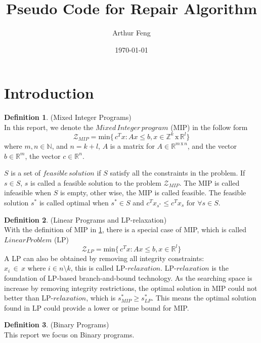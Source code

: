 \documentclass[11pt]{article}
\title{Pseudo Code for Repair Algorithm}
\author{Arthur Feng}
\date{\today}
\theoremstyle{definition}
\newtheorem{definition}{Definition}[section] %
\begin{document}
\maketitle

\section{Introduction}
\begin{definition}
(Mixed Integer Programs)\\
In this report, we denote the $Mixed\,Integer\, program$ (MIP) in the follow form $$\mathcal{Z}_{MIP} = \text{min} \{\, c^Tx : Ax \leq b, x \in \mathbb{Z}^k\,\text{x}\,\mathbb{R}^l \}  $$ 
where $m,n \in \mathbb{N}$, and $n = k + l $,  $A$ is a matrix for $A \in \mathbb{R}^{m \,\text{x}\, n}$, and the vector $b \in \mathbb{R}^m$, the vector $c \in \mathbb{R}^n$. \par
$S$ is a set of $feasible\,solution$ if $S$ satisfy all the constraints in the problem. If $s \in S$, $s$ is called a feasible solution to the problem $\mathcal{Z}_{MIP}$. The MIP is called infeasible when $S$ is empty, other wise, the MIP is called feasible. The feasible solution $s^\ast$ is called optimal when $s^\ast \in S $ and  $ c^Tx_{s^\ast} \leq c^Tx_s \text{ for } \forall s \in S $. \par
\label{dif:def_MIP}
\end{definition}

\begin{definition}
(Linear Programs and LP-relaxation)\\
With the definition of MIP in \ref{dif:def_MIP}, there is a special case of MIP, which is called $Linear Problem $ (LP)
$$\mathcal{Z}_{LP} = \text{min} \{\, c^Tx : Ax \leq b, x \in \mathbb{R}^l \}  $$ 
A LP can also be obtained by removing all integrity constraints: $x_i\, \in\, x \text{ where } i \in n \setminus k $, this is called LP-$relaxation$. LP-$relaxation$ is the foundation of LP-based branch-and-bound technology. As the searching space is increase by removing integrity restrictions, the optimal solution in MIP could not better than LP-$relaxation$, which is  $s_{MIP}^\ast \geq s_{LP}^\ast $. This means the optimal solution found in LP could provide a lower or prime bound for MIP.
\label{dif:def_lp}
\end{definition}

\begin{definition}
(Binary Programs)\\
This report we focus on Binary programs.

\label{dif:def_bp}
\end{definition}
\end{document}
